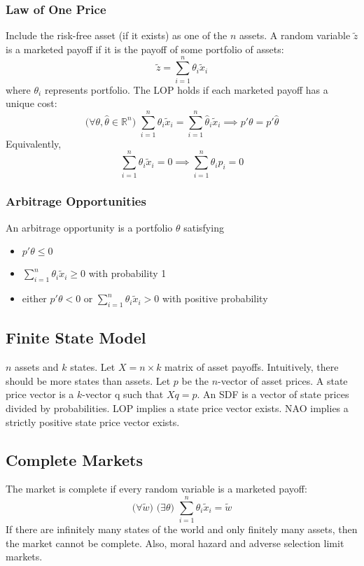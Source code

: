 \documentclass[11pt, a4paper, oneside]{article}
\theoremstyle{definition}
\theoremstyle{proposition}
\theoremstyle{corollary}
\theoremstyle{lemma}
\theoremstyle{theorem}
\begin{document}
\subsubsection{Law of One Price}
Include the risk-free asset (if it exists) as one of the $n$ assets. A random variable $\tilde{z}$ is a marketed payoff if it is the payoff of some portfolio of assets:
$$\tilde{z} = \sum_{i=1}^n \theta_i\tilde{x}_i$$ 
where $\theta_i$ represents portfolio.
The LOP holds if each marketed payoff has a unique cost:
$$(\forall \theta, \hat{\theta}\in\mathbb{R}^n\text{) } \sum_{i=1}^n \theta_i\tilde{x}_i = \sum_{i=1}^n \hat{\theta}_i \tilde{x}_i \implies p'\theta = p'\hat{\theta}$$
Equivalently, 
$$\sum_{i=1}^n \theta_i \tilde{x}_i = 0 \implies \sum_{i=1}^n \theta_ip_i = 0$$

\subsubsection{Arbitrage Opportunities}
An arbitrage opportunity is a portfolio $\theta$ satisfying
\begin{itemize}
\item $p'\theta \leq 0$
\item $\sum_{i=1}^n \theta_i \tilde{x}_i \geq 0$ with probability 1 
\item either $p'\theta < 0$ or $\sum_{i=1}^n \theta_i\tilde{x}_i > 0$ with positive probability 
\end{itemize}

\subsection{Finite State Model}
$n$ assets and $k$ states. Let $X = n\times k$ matrix of asset payoffs. Intuitively, there should be more states than assets. Let $p$ be the $n$-vector of asset prices. A state price vector is a $k$-vector q such that $Xq = p$. An SDF is a vector  of state prices divided by probabilities. LOP implies a state price vector exists. NAO implies a strictly positive state price vector exists. 

\subsection{Complete Markets}
The market is complete if every random variable is a marketed payoff: 
$$(\forall \tilde{w}\text{) } (\exists \theta\text{) } \sum_{i=1}^n \theta_i \tilde{x}_i = \tilde{w}$$
If there are infinitely many states of the world and only finitely many assets, then the market cannot be complete. Also, moral hazard and adverse selection limit markets. 
\end{document}
